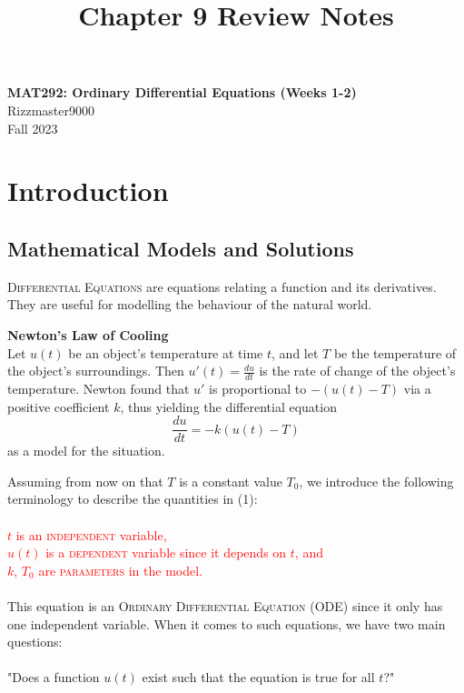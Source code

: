 \documentclass[11pt]{article}
\theoremstyle{definition}
\begin{document}
\setcounter{section}{0}
\title{Chapter 9 Review Notes}

\thispagestyle{empty}

\begin{center}
{\LARGE \bf MAT292: Ordinary Differential Equations (Weeks 1-2)}\\
{\large Rizzmaster9000}\\
Fall 2023
\end{center}
\section{Introduction}
\subsection{Mathematical Models and Solutions}
\textsc{Differential Equations} are equations relating a function and its derivatives. They are useful for modelling the behaviour of the natural world.
\begin{shaded}
\textbf{Newton's Law of Cooling}\\
Let $u(t)$ be an object's temperature at time $t$, and let $T$ be the temperature of the object's surroundings. Then $u'(t) = \frac{du}{dt}$ is the rate of change of the object's temperature. Newton found that $u'$ is proportional to $-(u(t) - T)$ via a positive coefficient $k$, thus yielding the differential equation \begin{equation}
    \frac{du}{dt} = -k(u(t) - T)
\end{equation} as a model for the situation.
\end{shaded}Assuming from now on that $T$ is a constant value $T_0$, we introduce the following terminology to describe the quantities in (1):\\\\\textcolor{red}{$t$ is an \textsc{independent} variable,\\ $u(t)$ is a \textsc{dependent} variable since it depends on $t$, and\\ $k$, $T_0$ are \textsc{parameters} in the model.}\\\\ This equation is an \textsc{Ordinary Differential Equation (ODE)} since it only has one independent variable. When it comes to such equations, we have two main questions:\\\\
"Does a function $u(t)$ exist such that the equation is true for all $t$?"\\
\end{document}
